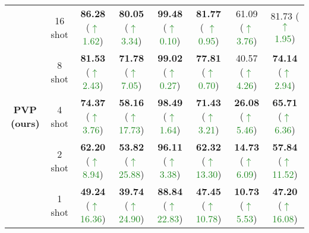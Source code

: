 \documentclass[10pt,journal,letterpaper,compsoc]{IEEEtran}
\begin{document}
\begin{table*}[h]
{{{\begin{tabular}{@{}cc|cccccc@{}}
        \multirow{5}{*}{\textbf{PVP (ours)}}
        & 16 shot & \textbf{86.28} (\textcolor{forestgreen}{$\uparrow$1.62}) & \textbf{80.05} (\textcolor{forestgreen}{$\uparrow$3.34}) & \textbf{99.48} (\textcolor{forestgreen}{$\uparrow$0.10}) & \textbf{81.77} (
        \textcolor{forestgreen}{$\uparrow$0.95}) & 61.09 (\textcolor{forestgreen}{$\uparrow$3.76}) & 81.73 (\textcolor{forestgreen}{$\uparrow$1.95}) \\
        & 8 shot  & \textbf{81.53} (\textcolor{forestgreen}{$\uparrow$2.43}) & \textbf{71.78} (\textcolor{forestgreen}{$\uparrow$7.05}) & \textbf{99.02} (\textcolor{forestgreen}{$\uparrow$0.27}) & \textbf{77.81} (\textcolor{forestgreen}{$\uparrow$0.70}) & 40.57 (\textcolor{forestgreen}{$\uparrow$4.26}) & \textbf{74.14} (\textcolor{forestgreen}{$\uparrow$2.94}) \\
        & 4 shot  & \textbf{74.37} (\textcolor{forestgreen}{$\uparrow$3.76}) & \textbf{58.16} (\textcolor{forestgreen}{$\uparrow$17.73}) & \textbf{98.49} (\textcolor{forestgreen}{$\uparrow$1.64}) & \textbf{71.43} (\textcolor{forestgreen}{$\uparrow$3.21}) & \textbf{26.08} (\textcolor{forestgreen}{$\uparrow$5.46}) & \textbf{65.71} (\textcolor{forestgreen}{$\uparrow$6.36}) \\
        & 2 shot  & \textbf{62.20} (\textcolor{forestgreen}{$\uparrow$8.94}) & \textbf{53.82} (\textcolor{forestgreen}{$\uparrow$25.88}) & \textbf{96.11} (\textcolor{forestgreen}{$\uparrow$3.38}) & \textbf{62.32} (\textcolor{forestgreen}{$\uparrow$13.30}) & \textbf{14.73} (\textcolor{forestgreen}{$\uparrow$6.09}) & \textbf{57.84} (\textcolor{forestgreen}{$\uparrow$11.52}) \\
        & 1 shot  & \textbf{49.24} (\textcolor{forestgreen}{$\uparrow$16.36}) & \textbf{39.74} (\textcolor{forestgreen}{$\uparrow$24.90}) & \textbf{88.84} (\textcolor{forestgreen}{$\uparrow$22.83}) & \textbf{47.45} (\textcolor{forestgreen}{$\uparrow$10.78}) & \textbf{10.73} (\textcolor{forestgreen}{$\uparrow$5.53}) & \textbf{47.20} (\textcolor{forestgreen}{$\uparrow$16.08}) \\ \bottomrule
    \end{tabular}
    }}}
\end{table*}
\end{document}
